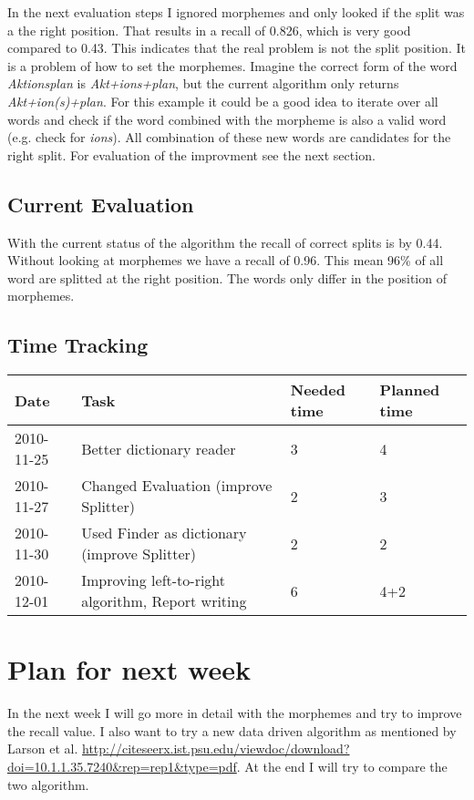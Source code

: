 \documentclass[11pt, accentcolor=tud9b, nochapname]{tudexercise}
\begin{document}
In the next evaluation steps I ignored morphemes and only looked if
the split was a the right position. That results in a recall of 0.826,
which is very good compared to 0.43. This indicates that the real
problem is not the split position. It is a problem of how to set the
morphemes. Imagine the correct form of the word \emph{Aktionsplan} is
\emph{Akt+ions+plan}, but the current algorithm only returns
\emph{Akt+ion(s)+plan}. For this example it could be a good idea to iterate over
all words and check if the word combined with the morpheme is also a
valid word (e.g. check for \emph{ions}). All combination of these new words are candidates for the right split. For evaluation of the improvment see the next section.

\subsection{Current Evaluation}
With the current status of the algorithm the recall of correct splits
is by 0.44. Without looking at morphemes we have a recall of 0.96. This
mean 96\% of all word are splitted at the right position. The words
only differ in the position of morphemes.


\subsection{Time Tracking}

\begin{tabular}{l | l | l | l}
  \hline
  \textbf{Date} & \textbf{Task} & \textbf{Needed time} & \textbf{Planned time} \\ \hline
  2010-11-25 & Better dictionary reader & 3 & 4 \\ \hline
  2010-11-27 & Changed Evaluation (improve Splitter) & 2 & 3 \\ \hline
  2010-11-30 & Used Finder as dictionary (improve Splitter) & 2 & 2 \\ \hline
  2010-12-01 & Improving left-to-right algorithm, Report writing & 6 & 4+2  \\ \hline
\end{tabular}

\section{Plan for next week}
In the next week I will go more in detail with the morphemes and try
to improve the recall value. I also want to try a new data driven
algorithm as mentioned by Larson et
al. \url{http://citeseerx.ist.psu.edu/viewdoc/download?doi=10.1.1.35.7240\&rep=rep1\&type=pdf}. At the end I will try to compare the two algorithm.
\end{document}

